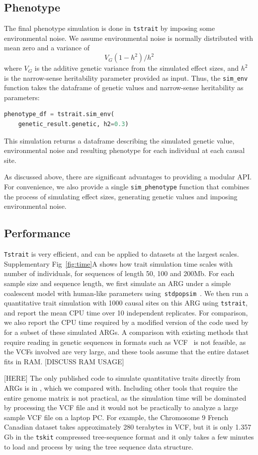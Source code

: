\documentclass[unnumsec,webpdf,modern,large,namedate]{oup-authoring-template}%
\begin{document}
\subsection{Phenotype}
The final phenotype simulation is done in \texttt{tstrait}
by imposing some environmental noise.
We assume environmental noise is normally distributed with mean zero
and a variance of
\[
V_G(1-h^2)/{h^2}
\]
where $V_G$ is the additive genetic variance from the simulated effect sizes,
and $h^2$ is the narrow-sense heritability parameter provided as input.
Thus, the \texttt{sim\_env} function takes the dataframe of genetic values
and narrow-sense heritability as parameters:
\begin{lstlisting}[language=Python]
phenotype_df = tstrait.sim_env(
    genetic_result.genetic, h2=0.3)
\end{lstlisting}
This simulation returns a dataframe
describing the simulated genetic value, environmental noise and
resulting phenotype for each individual at each causal site.

As discussed above, there are significant advantages to providing a modular
API. For convenience, we also provide a single
\texttt{sim\_phenotype} function that combines the process of simulating
effect sizes, generating genetic values and imposing environmental noise.

\subsection{Performance}
\texttt{Tstrait} is very efficient, and can be applied to datasets at the
largest scales.
Supplementary Fig~\ref{fig:time}A shows how trait simulation time scales
with number of individuals, for sequences of length 50, 100 and 200Mb.
For each sample size and sequence length,
we first simulate an ARG under a simple coalescent model with
human-like parameters using~\texttt{stdpopsim}~\citep{adrion2020}.
We then run a quantitative trait simulation
with 1000 causal sites on this ARG using \texttt{tstrait},
and report the mean CPU time over 10 independent replicates.
For comparison, we also report the CPU time required by a
modified version of the code used by \citet{martin2017} for a
subset of these simulated ARGs.
A comparison with existing methods that require reading
in genetic sequences in formats such as
VCF~\citep[e.g.][]{meyer2018,fernandes2020} is not feasible,
as the VCFs involved are very large, and these tools assume that
the entire dataset fits in RAM.
[DISCUSS RAM USAGE]

[HERE]
The only published code to simulate quantitative traits
directly from ARGs is in \cite{martin2017}, which we compared with. Including
other tools that require the entire genome matrix is not practical, as the
simulation time will be dominated by processing the VCF file and it would not
be practically to analyze a large sample VCF file on a laptop PC. For example,
the Chromosome 9 French Canadian dataset takes approximately 280 terabytes in
VCF, but it is only 1.357 Gb in the \texttt{tskit} compressed
tree-sequence format and it only takes a few minutes to load and process by
using the tree sequence data structure.
\end{document}
